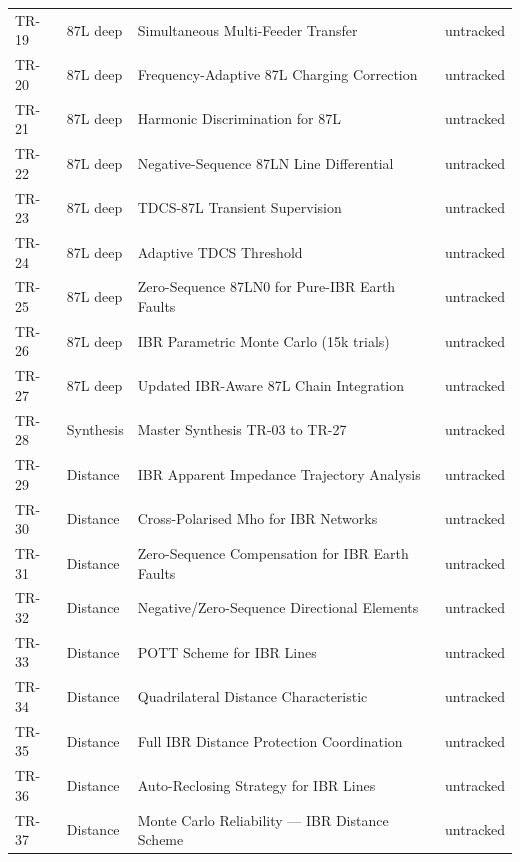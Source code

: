 \documentclass[11pt,a4paper]{article}
\begin{document}
\begin{longtable}{llp{8cm}l}
TR-19 & 87L deep & Simultaneous Multi-Feeder Transfer & \textcolor{untrackedorange}{untracked} \\
TR-20 & 87L deep & Frequency-Adaptive 87L Charging Correction & \textcolor{untrackedorange}{untracked} \\
TR-21 & 87L deep & Harmonic Discrimination for 87L & \textcolor{untrackedorange}{untracked} \\
TR-22 & 87L deep & Negative-Sequence 87LN Line Differential & \textcolor{untrackedorange}{untracked} \\
TR-23 & 87L deep & TDCS-87L Transient Supervision & \textcolor{untrackedorange}{untracked} \\
TR-24 & 87L deep & Adaptive TDCS Threshold & \textcolor{untrackedorange}{untracked} \\
TR-25 & 87L deep & Zero-Sequence 87LN0 for Pure-IBR Earth Faults & \textcolor{untrackedorange}{untracked} \\
TR-26 & 87L deep & IBR Parametric Monte Carlo (15k trials) & \textcolor{untrackedorange}{untracked} \\
TR-27 & 87L deep & Updated IBR-Aware 87L Chain Integration & \textcolor{untrackedorange}{untracked} \\
TR-28 & Synthesis & Master Synthesis TR-03 to TR-27 & \textcolor{untrackedorange}{untracked} \\
TR-29 & Distance & IBR Apparent Impedance Trajectory Analysis & \textcolor{untrackedorange}{untracked} \\
TR-30 & Distance & Cross-Polarised Mho for IBR Networks & \textcolor{untrackedorange}{untracked} \\
TR-31 & Distance & Zero-Sequence Compensation for IBR Earth Faults & \textcolor{untrackedorange}{untracked} \\
TR-32 & Distance & Negative/Zero-Sequence Directional Elements & \textcolor{untrackedorange}{untracked} \\
TR-33 & Distance & POTT Scheme for IBR Lines & \textcolor{untrackedorange}{untracked} \\
TR-34 & Distance & Quadrilateral Distance Characteristic & \textcolor{untrackedorange}{untracked} \\
TR-35 & Distance & Full IBR Distance Protection Coordination & \textcolor{untrackedorange}{untracked} \\
TR-36 & Distance & Auto-Reclosing Strategy for IBR Lines & \textcolor{untrackedorange}{untracked} \\
TR-37 & Distance & Monte Carlo Reliability — IBR Distance Scheme & \textcolor{untrackedorange}{untracked} \\

\end{longtable}
\end{document}

